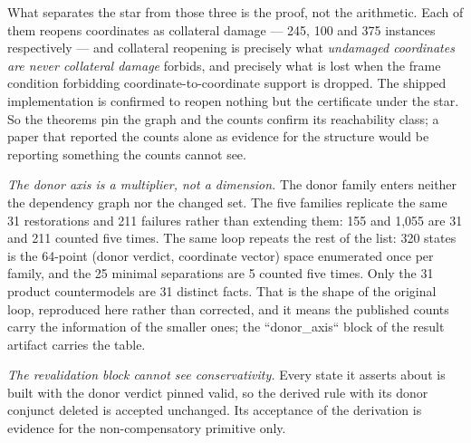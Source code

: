 What separates the star from those three is the proof, not the arithmetic. Each
of them reopens coordinates as collateral damage --- 245, 100 and 375 instances
respectively --- and collateral reopening is precisely what
\emph{undamaged coordinates are never collateral damage} forbids, and precisely what
is lost when the frame condition forbidding coordinate-to-coordinate support is
dropped. The shipped implementation is confirmed to reopen nothing but the
certificate under the star. So the theorems pin the graph and the counts confirm
its reachability class; a paper that reported the counts alone as evidence for
the structure would be reporting something the counts cannot see.

\emph{The donor axis is a multiplier, not a dimension.} The donor family enters
neither the dependency graph nor the changed set. The five families replicate
the same 31 restorations and 211 failures rather than extending them: 155 and
1,055 are 31 and 211 counted five times. The same loop repeats the rest of the
list: 320 states is the 64-point (donor verdict, coordinate vector) space
enumerated once per family, and the 25 minimal separations are 5 counted five
times. Only the 31 product countermodels are 31 distinct facts. That is the
shape of the original loop, reproduced here rather than corrected, and it means
the published counts carry the information of the smaller ones; the
``donor_axis`` block of the result artifact carries the table.

\emph{The revalidation block cannot see conservativity.} Every state it asserts about
is built with the donor verdict pinned valid, so the derived rule with its donor
conjunct deleted is accepted unchanged. Its acceptance of the derivation is
evidence for the non-compensatory primitive only.
